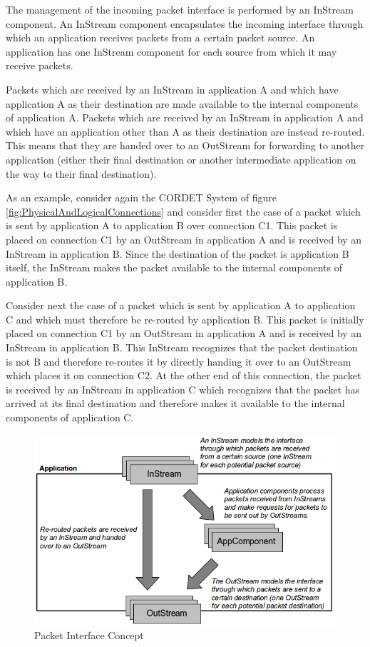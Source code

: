 \documentclass[a4paper,10pt]{article}
\begin{document}
The management of the incoming packet interface is performed by an InStream component. An InStream component encapsulates the incoming interface through which an application receives packets from a certain packet source. An application has one InStream component for each source from which it may receive packets.

Packets which are received by an InStream in application A and which have application A as their destination are made available to the internal components of application A. Packets which are received by an InStream in application A and which have an application other than A as their destination are instead re-routed. This means that they are handed over to an OutStream for forwarding to another application (either their final destination or another intermediate application on the way to their final destination).

As an example, consider again the CORDET System of figure \ref{fig:PhysicalAndLogicalConnections} and consider first the case of a packet which is sent by application A to application B over connection C1. This packet is placed on connection C1 by an OutStream in application A and is received by an InStream in application B. Since the destination of the packet is application B itself, the InStream makes the packet available to the internal components of application B.

Consider next the case of a packet which is sent by application A to application C and which must therefore be re-routed by application B. This packet is initially placed on connection C1 by an OutStream in application A and is received by an InStream in application B. This InStream recognizes that the packet destination is not B and therefore re-routes it by directly handing it over to an OutStream which places it on connection C2. At the other end of this connection, the packet is received by an InStream in application C which recognizes that the packet has arrived at its final destination and therefore makes it available to the internal components of application C. 

\begin{figure}[ht]
 \centering
 \includegraphics[scale=0.35,keepaspectratio=true]{PcktInterfaceConcept.png}
 \caption{Packet Interface Concept}
 \label{fig:PcktInterfaceConcept}
\end{figure}
\end{document}

